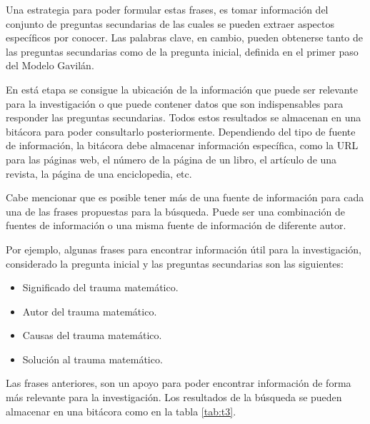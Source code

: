 Una estrategia para poder formular estas frases, es tomar información del conjunto de preguntas secundarias de las cuales se pueden extraer aspectos específicos por conocer. Las palabras clave, en cambio, pueden obtenerse tanto de las preguntas secundarias como de la pregunta inicial, definida en el primer paso del Modelo Gavilán.

En está etapa se consigue la ubicación de la información que puede ser relevante para la investigación o que puede contener datos que son indispensables para responder las preguntas secundarias. Todos estos resultados se almacenan en una bitácora para poder consultarlo posteriormente. Dependiendo del tipo de fuente de información, la bitácora debe almacenar información específica, como la URL para las páginas web, el número de la página de un libro, el artículo de una revista, la página de una enciclopedia, etc.

Cabe mencionar que es posible tener más de una fuente de información para cada una de las frases propuestas para la búsqueda. Puede ser una combinación de fuentes de información o una misma fuente de información de diferente autor.

Por ejemplo, algunas frases para encontrar información útil para la investigación, considerado la pregunta inicial y las preguntas secundarias son las siguientes:

\begin{itemize}
  \item Significado del trauma matemático.
  \item Autor del trauma matemático.
  \item Causas del trauma matemático.
  \item Solución al trauma matemático.
\end{itemize}

Las frases anteriores, son un apoyo para poder encontrar información de forma más relevante para la investigación. Los resultados de la búsqueda se pueden almacenar en una bitácora como en la tabla \ref{tab:t3}.

